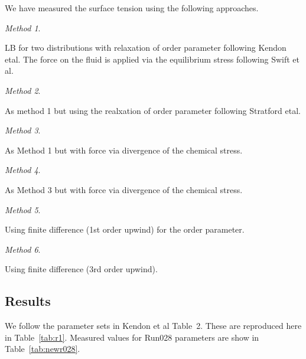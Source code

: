 We have measured the surface tension using the following approaches.

\textit{Method 1}.

LB for two distributions with relaxation of order parameter
following Kendon etal. The force on the fluid is applied
via the equilibrium stress following Swift et al.

\textit{Method 2}.

As method 1 but using the realxation of order parameter
following Stratford etal.

\textit{Method 3}.

As Method 1 but with force via divergence of the chemical stress.

\textit{Method 4}.

As Method 3 but with force via divergence of the chemical stress.

\textit{Method 5}.

Using finite difference (1st order upwind) for the order parameter.

\textit{Method 6}.

Using finite difference (3rd order upwind).

\subsection{Results}

We follow the parameter sets in Kendon et al Table~2. These
are reproduced here in Table~\ref{tab:r1}. Measured values for
Run028 parameters are show in Table~\ref{tab:newr028}.


